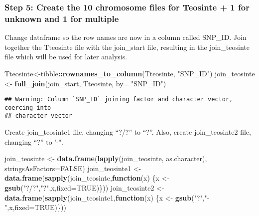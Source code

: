 \documentclass[]{article}
\newenvironment{Shaded}{\begin{snugshade}}{\end{snugshade}}
\newcommand{\ControlFlowTok}[1]{\textcolor[rgb]{0.13,0.29,0.53}{\textbf{#1}}}
\newcommand{\DataTypeTok}[1]{\textcolor[rgb]{0.13,0.29,0.53}{#1}}
\newcommand{\KeywordTok}[1]{\textcolor[rgb]{0.13,0.29,0.53}{\textbf{#1}}}
\newcommand{\NormalTok}[1]{#1}
\newcommand{\OperatorTok}[1]{\textcolor[rgb]{0.81,0.36,0.00}{\textbf{#1}}}
\newcommand{\OtherTok}[1]{\textcolor[rgb]{0.56,0.35,0.01}{#1}}
\newcommand{\StringTok}[1]{\textcolor[rgb]{0.31,0.60,0.02}{#1}}
\begin{document}
\hypertarget{step-5-create-the-10-chromosome-files-for-teosinte-1-for-unknown-and-1-for-multiple}{%
\subsubsection{Step 5: Create the 10 chromosome files for Teosinte + 1
for unknown and 1 for
multiple}\label{step-5-create-the-10-chromosome-files-for-teosinte-1-for-unknown-and-1-for-multiple}}

Change dataframe so the row names are now in a column called SNP\_ID.
Join together the Tteosinte file with the join\_start file, resulting in
the join\_teosinte file which will be used for later analysis.

\begin{Shaded}
\begin{Highlighting}[]
\NormalTok{Tteosinte<-tibble}\OperatorTok{::}\KeywordTok{rownames_to_column}\NormalTok{(Tteosinte, }\StringTok{"SNP_ID"}\NormalTok{) }
\NormalTok{join_teosinte <-}\StringTok{ }\KeywordTok{full_join}\NormalTok{(join_start, Tteosinte, }\DataTypeTok{by=} \StringTok{"SNP_ID"}\NormalTok{)}
\end{Highlighting}
\end{Shaded}

\begin{verbatim}
## Warning: Column `SNP_ID` joining factor and character vector, coercing into
## character vector
\end{verbatim}

Create join\_teosinte1 file, changing ``?/?'' to ``?''. Also, create
join\_teosinte2 file, changing ``?'' to '-".

\begin{Shaded}
\begin{Highlighting}[]
\NormalTok{join_teosinte <-}\StringTok{ }\KeywordTok{data.frame}\NormalTok{(}\KeywordTok{lapply}\NormalTok{(join_teosinte, as.character),}
                            \DataTypeTok{stringsAsFactors=}\OtherTok{FALSE}\NormalTok{)}
\NormalTok{join_teosinte1 <-}\StringTok{ }\KeywordTok{data.frame}\NormalTok{(}\KeywordTok{sapply}\NormalTok{(join_teosinte,}\ControlFlowTok{function}\NormalTok{(x) }
\NormalTok{                  \{x <-}\StringTok{ }\KeywordTok{gsub}\NormalTok{(}\StringTok{"?/?"}\NormalTok{,}\StringTok{"?"}\NormalTok{,x,}\DataTypeTok{fixed=}\OtherTok{TRUE}\NormalTok{)\}))}
\NormalTok{join_teosinte2 <-}\StringTok{ }\KeywordTok{data.frame}\NormalTok{(}\KeywordTok{sapply}\NormalTok{(join_teosinte1,}\ControlFlowTok{function}\NormalTok{(x) }
\NormalTok{                  \{x <-}\StringTok{ }\KeywordTok{gsub}\NormalTok{(}\StringTok{"?"}\NormalTok{,}\StringTok{"-"}\NormalTok{,x,}\DataTypeTok{fixed=}\OtherTok{TRUE}\NormalTok{)\}))}
\end{Highlighting}
\end{Shaded}
\end{document}
